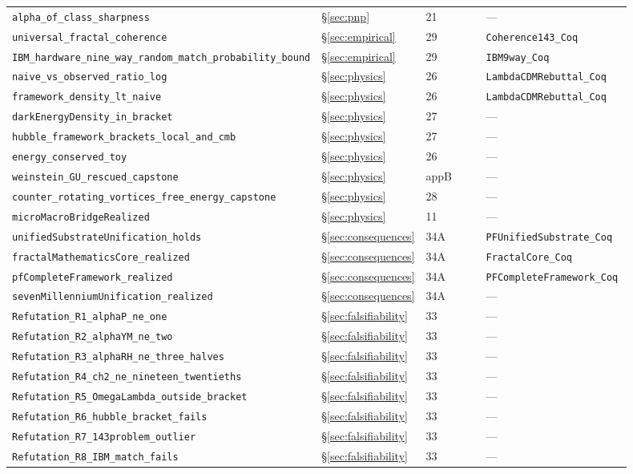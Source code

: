 \documentclass[11pt,a4paper]{article}
\theoremstyle{definition}
\theoremstyle{remark}
\newcommand{\lean}[1]{\texttt{\small #1}}
\begin{document}
\begin{longtable}{p{0.40\linewidth} p{0.13\linewidth} p{0.13\linewidth} p{0.24\linewidth}}
\lean{alpha\_of\_class\_sharpness} & \S\ref{sec:pnp} & 21 & --- \\
\lean{universal\_fractal\_coherence} & \S\ref{sec:empirical} & 29 & \lean{Coherence143\_Coq} \\
\lean{IBM\_hardware\_nine\_way\_random\_match\_probability\_bound} & \S\ref{sec:empirical} & 29 & \lean{IBM9way\_Coq} \\
\lean{naive\_vs\_observed\_ratio\_log} & \S\ref{sec:physics} & 26 & \lean{LambdaCDMRebuttal\_Coq} \\
\lean{framework\_density\_lt\_naive} & \S\ref{sec:physics} & 26 & \lean{LambdaCDMRebuttal\_Coq} \\
\lean{darkEnergyDensity\_in\_bracket} & \S\ref{sec:physics} & 27 & --- \\
\lean{hubble\_framework\_brackets\_local\_and\_cmb} & \S\ref{sec:physics} & 27 & --- \\
\lean{energy\_conserved\_toy} & \S\ref{sec:physics} & 26 & --- \\
\lean{weinstein\_GU\_rescued\_capstone} & \S\ref{sec:physics} & appB & --- \\
\lean{counter\_rotating\_vortices\_free\_energy\_capstone} & \S\ref{sec:physics} & 28 & --- \\
\lean{microMacroBridgeRealized} & \S\ref{sec:physics} & 11 & --- \\
\lean{unifiedSubstrateUnification\_holds} & \S\ref{sec:consequences} & 34A & \lean{PFUnifiedSubstrate\_Coq} \\
\lean{fractalMathematicsCore\_realized} & \S\ref{sec:consequences} & 34A & \lean{FractalCore\_Coq} \\
\lean{pfCompleteFramework\_realized} & \S\ref{sec:consequences} & 34A & \lean{PFCompleteFramework\_Coq} \\
\lean{sevenMillenniumUnification\_realized} & \S\ref{sec:consequences} & 34A & --- \\
\lean{Refutation\_R1\_alphaP\_ne\_one} & \S\ref{sec:falsifiability} & 33 & --- \\
\lean{Refutation\_R2\_alphaYM\_ne\_two} & \S\ref{sec:falsifiability} & 33 & --- \\
\lean{Refutation\_R3\_alphaRH\_ne\_three\_halves} & \S\ref{sec:falsifiability} & 33 & --- \\
\lean{Refutation\_R4\_ch2\_ne\_nineteen\_twentieths} & \S\ref{sec:falsifiability} & 33 & --- \\
\lean{Refutation\_R5\_OmegaLambda\_outside\_bracket} & \S\ref{sec:falsifiability} & 33 & --- \\
\lean{Refutation\_R6\_hubble\_bracket\_fails} & \S\ref{sec:falsifiability} & 33 & --- \\
\lean{Refutation\_R7\_143problem\_outlier} & \S\ref{sec:falsifiability} & 33 & --- \\
\lean{Refutation\_R8\_IBM\_match\_fails} & \S\ref{sec:falsifiability} & 33 & --- \\
\bottomrule
\end{longtable}
\end{document}
